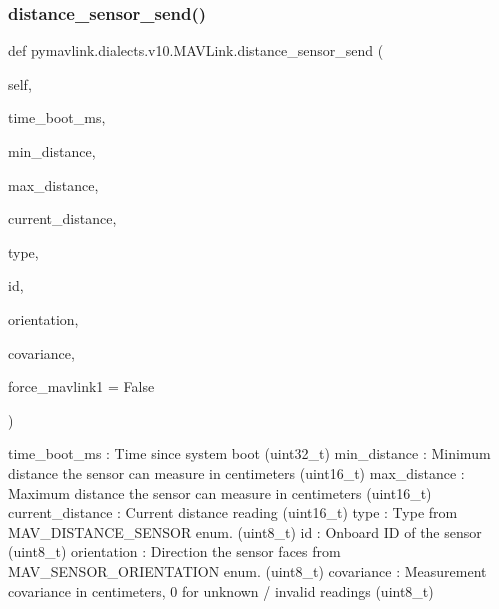 \begin{DoxyVerb}
\begin{DoxyVerb}
\subsubsection{\texorpdfstring{distance\+\_\+sensor\+\_\+send()}{distance\_sensor\_send()}}
{\footnotesize\ttfamily def pymavlink.\+dialects.\+v10.\+M\+A\+V\+Link.\+distance\+\_\+sensor\+\_\+send (\begin{DoxyParamCaption}\item[{}]{self,  }\item[{}]{time\+\_\+boot\+\_\+ms,  }\item[{}]{min\+\_\+distance,  }\item[{}]{max\+\_\+distance,  }\item[{}]{current\+\_\+distance,  }\item[{}]{type,  }\item[{}]{id,  }\item[{}]{orientation,  }\item[{}]{covariance,  }\item[{}]{force\+\_\+mavlink1 = {\ttfamily False} }\end{DoxyParamCaption})}

\begin{DoxyVerb}time_boot_ms              : Time since system boot (uint32_t)
min_distance              : Minimum distance the sensor can measure in centimeters (uint16_t)
max_distance              : Maximum distance the sensor can measure in centimeters (uint16_t)
current_distance          : Current distance reading (uint16_t)
type                      : Type from MAV_DISTANCE_SENSOR enum. (uint8_t)
id                        : Onboard ID of the sensor (uint8_t)
orientation               : Direction the sensor faces from MAV_SENSOR_ORIENTATION enum. (uint8_t)
covariance                : Measurement covariance in centimeters, 0 for unknown / invalid readings (uint8_t)\end{DoxyVerb}
 \mbox{\label{classpymavlink_1_1dialects_1_1v10_1_1MAVLink_a05690382b83a4f3e13ef596d03a8d8fb}} 

\end{DoxyVerb}
\end{DoxyVerb}
